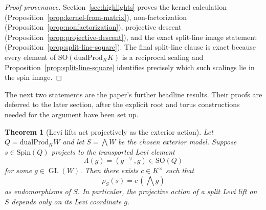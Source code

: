 \documentclass[11pt,a4paper]{article}
\theoremstyle{plain}
\newtheorem{theorem}{Theorem}[section]
\theoremstyle{definition}
\theoremstyle{remark}
\newcommand{\Spin}{\mathrm{Spin}}
\newcommand{\SO}{\mathrm{SO}}
\newcommand{\dualProd}{\mathrm{dualProd}}
\begin{document}
\begin{proof}[Proof provenance]
Section~\ref{sec:highlights} proves the kernel calculation
(Proposition~\ref{prop:kernel-from-matrix}), non-factorization
(Proposition~\ref{prop:nonfactorization}), projective descent
(Proposition~\ref{prop:projective-descent}), and the exact split-line image
statement (Proposition~\ref{prop:split-line-square}). The final split-line
clause is exact because every element of $\SO(\dualProd_K K)$ is a reciprocal
scaling and Proposition~\ref{prop:split-line-square} identifies precisely which
such scalings lie in the spin image.
\end{proof}

The next two statements are the paper's further headline results. Their proofs
are deferred to the later section, after the explicit root and torus
constructions needed for the argument have been set up.

\begin{theorem}[Levi lifts act projectively as the exterior action]
\label{thm:levi-projective-exterior}
Let $Q=\dualProd_K W$ and let $S=\bigwedge W$ be the chosen exterior model.
Suppose $s\in \Spin(Q)$ projects to the transported Levi element
\[
  \Lambda(g)=(g^{-{\vee}},g)\in \SO(Q)
\]
for some $g\in \operatorname{GL}(W)$. Then there exists $c\in K^\times$ such that
\[
  \rho_S(s)=c\,(\bigwedge g)
\]
as endomorphisms of $S$. In particular, the projective action of a split Levi
lift on $S$ depends only on its Levi coordinate $g$.
\end{theorem}
\end{document}
